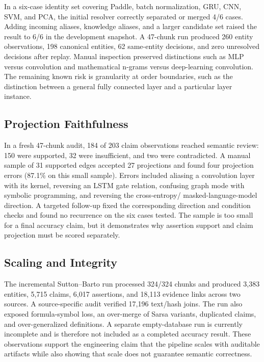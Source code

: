 \documentclass[11pt]{article}
\begin{document}
In a six-case identity set covering Paddle, batch normalization, GRU, CNN, SVM, and PCA, the initial resolver correctly separated or merged 4/6 cases. Adding incoming aliases, knowledge aliases, and a larger candidate set raised the result to 6/6 in the development snapshot. A 47-chunk run produced 260 entity observations, 198 canonical entities, 62 same-entity decisions, and zero unresolved decisions after replay. Manual inspection preserved distinctions such as MLP versus convolution and mathematical n-grams versus deep-learning convolution. The remaining known risk is granularity at order boundaries, such as the distinction between a general fully connected layer and a particular layer instance.

\subsection{Projection Faithfulness}

In a fresh 47-chunk audit, 184 of 203 claim observations reached semantic review: 150 were supported, 32 were insufficient, and two were contradicted. A manual sample of 31 supported edges accepted 27 projections and found four projection errors (87.1\% on this small sample). Errors included aliasing a convolution layer with its kernel, reversing an LSTM gate relation, confusing graph mode with symbolic programming, and reversing the cross-entropy/ masked-language-model direction. A targeted follow-up fixed the corresponding direction and condition checks and found no recurrence on the six cases tested. The sample is too small for a final accuracy claim, but it demonstrates why assertion support and claim projection must be scored separately.

\subsection{Scaling and Integrity}

The incremental Sutton--Barto run processed 324/324 chunks and produced 3,383 entities, 5,715 claims, 6,017 assertions, and 18,113 evidence links across two sources. A source-specific audit verified 17,196 text/hash joins. The run also exposed formula-symbol loss, an over-merge of Sarsa variants, duplicated claims, and over-generalized definitions. A separate empty-database run is currently incomplete and is therefore not included as a completed accuracy result. These observations support the engineering claim that the pipeline scales with auditable artifacts while also showing that scale does not guarantee semantic correctness.
\end{document}
